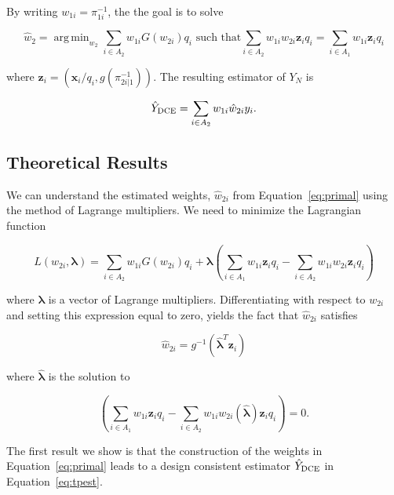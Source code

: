 \documentclass[12pt]{article}
\DeclareMathOperator*{\argmin}{arg\,min}
\renewcommand{\bf}[1]{\mathbf{#1}}
\begin{document}
By writing $w_{1i} = \pi_{1i}^{-1}$, the the goal is to solve

\begin{equation}\label{eq:primal}
  \hat w_2  = \argmin_{w_{2}} \sum_{i \in A_2} w_{1i} G(w_{2i}) q_i 
  \text{ such that}
  \sum_{i \in A_2} w_{1i} w_{2i} \bf z_i q_i = \sum_{i \in A_1} w_{1i} \bf z_i q_i
\end{equation}

where  $\bf z_i = (\bf x_i / q_i, g(\pi_{2i|1}^{-1}))$. The resulting 
estimator of $Y_N$ is 

\begin{equation}\label{eq:tpest}
\hat Y_{\rm DCE} = \sum_{i \in A_2} w_{1i} \hat w_{2i} y_i.
\end{equation}

\subsection{Theoretical Results}

We can understand the estimated weights, $\hat w_{2i}$ from
Equation~\ref{eq:primal} using the method of Lagrange multipliers. We need to
minimize the Lagrangian function

\begin{equation}\label{eq:legragedc1}
  L(w_{2i}, \bm \lambda) = \sum_{i \in A_2} w_{1i} G(w_{2i}) q_i 
  + \bm \lambda \left( \sum_{i \in A_1} w_{1i} \bf z_i q_i -
    \sum_{i \in A_2} w_{1i} w_{2i} \bf z_i q_i\right)
\end{equation}

where $\bm \lambda$ is a vector of Lagrange multipliers.
Differentiating with respect to $w_{2i}$ and setting this expression equal to
zero, yields the fact that $\hat w_{2i}$ satisfies 

$$ \hat w_{2i} = g^{-1}(\hat{\bm \lambda}^T \bf z_i) $$

where $\hat{\bm \lambda}$ is the solution to

\begin{equation}\label{eq:lamdc1}
  \left( \sum_{i \in A_1} w_{1i} \bf z_i q_i -
  \sum_{i \in A_2} w_{1i} w_{2i}(\hat{\bm \lambda}) \bf z_i q_i\right) = 0.
\end{equation}

The first result we show is that the construction of the weights in
Equation~\ref{eq:primal} leads to a design consistent estimator 
$\hat Y_{\rm DCE}$ in Equation~\ref{eq:tpest}.
\end{document}
